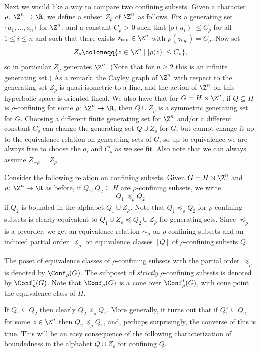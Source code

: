 Next we would like a way to compare two confining subsets. Given a character $\rho\colon \Z^n\to\R$, we define a subset $Z_\rho$ of $\Z^n$ as follows. Fix a generating set $\{a_1,\dots,a_n\}$ for $\Z^n$, and a constant $C_\rho>0$ such that $|\rho(a_i)| \leq C_\rho$ for all $1\le i\le n$ and such that there exists $z_{top}\in \Z^n$ with $\rho(z_{top})=C_\rho$. Now set
\[
Z_\rho \coloneqq \{z\in\Z^n \mid |\rho(z)|\le C_\rho\}\text{,}
\]
so in particular $Z_\rho$ generates $\Z^n$. (Note that for $n\ge 2$ this is an infinite generating set.) As a remark, the Cayley graph of $\Z^n$ with respect to the generating set $Z_\rho$ is quasi-isometric to a line, and the action of $\Z^n$ on this hyperbolic space is oriented lineal. We also have that for $G=H\rtimes \Z^n$, if $Q\subseteq H$ is $\rho$-confining for some $\rho\colon \Z^n\to\R$, then $Q\cup Z_\rho$ is a symmetric generating set for $G$. Choosing a different finite generating set for $\Z^n$ and/or a different constant $C_\rho$ can change the generating set $Q\cup Z_\rho$ for $G$, but cannot change it up to the equivalence relation on generating sets of $G$, so up to equivalence we are always free to choose the $a_i$ and $C_\rho$ as we see fit. Also note that we can always assume $Z_{-\rho}=Z_\rho$.

Consider the following relation on confining subsets. Given $G=H\rtimes \Z^n$ and $\rho\colon\Z^n\to\R$ as before, if $Q_1,Q_2\subseteq H$ are $\rho$-confining subsets, we write
\[
Q_1\preceq_\rho Q_2
\]
if $Q_2$ is bounded in the alphabet $Q_1\cup Z_\rho$. Note that $Q_1\preceq_\rho Q_2$ for $\rho$-confining subsets is clearly equivalent to $Q_1\cup Z_\rho\preceq Q_2\cup Z_\rho$ for generating sets. Since $\preceq_\rho$ is a preorder, we get an equivalence relation $\sim_\rho$ on $\rho$-confining subsets and an induced partial order $\preccurlyeq_\rho$ on equivalence classes $[Q]$ of $\rho$-confining subsets $Q$.

\begin{defi}\label{def:conf_poset}
The poset of equivalence classes of $\rho$-confining subsets with the partial order $\preccurlyeq_\rho$ is denoted by $\Conf_\rho(G)$. The subposet of \emph{strictly} $\rho$-confining subsets is denoted by $\Conf^\ast_\rho(G)$. Note that $\Conf_\rho(G)$ is a cone over $\Conf^\ast_\rho(G)$, with cone point the equivalence class of $H$.
\end{defi}

If $Q_1 \subseteq Q_2$ then clearly $Q_2 \preceq_\rho Q_1$. More generally, it turns out that if $Q_1^z \subseteq Q_2$ for some $z\in \Z^n$ then $Q_2 \preceq_\rho Q_1$, and, perhaps surprisingly, the converse of this is true. This will be an easy consequence of the following characterization of boundedness in the alphabet $Q\cup Z_\rho$ for confining $Q$.

